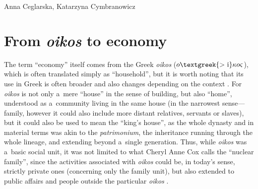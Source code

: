\begin{artengenv2auth}{Anna Ceglarska, Katarzyna Cymbranowicz}
\section{From \textit{oikos} to economy}

The term ``economy'' itself comes from the Greek \textit{oikos} ($o\text{\textgreek{>~i}}\kappa o\varsigma $), which is often translated simply as ``household'', but it is worth noting that its use in Greek is often broader and also changes depending on the context 
\parencite[][p.2]{roy_polis_1999}. %
 For \textit{oikos} is not only a~mere ``house'' in the sense of building, but also ``home'', understood as a~community living in the same house (in the narrowest sense---family, however it could also include more distant relatives, servants or slaves), but it could also be used to mean the ``king's house'', as the whole dynasty 
\parencite[][V.31, VI.9]{herodotus_histories_1920} %
 and in material terms was akin to the \textit{patrimonium}, the inheritance running through the whole lineage, and extending beyond a~single generation. Thus, while \textit{oikos} was a~basic social unit, it was not limited to what Cheryl Anne Cox 
\parencite*[][]{cox_household_1998} %
 calls the ``nuclear family'', since the activities associated with \textit{oikos} could be, in today's sense, strictly private ones (concerning only the family unit), but also extended to public affairs and people outside the particular \textit{oikos} 
\parencite[][]{martin_urban_2016}.%





\end{artengenv2auth}
